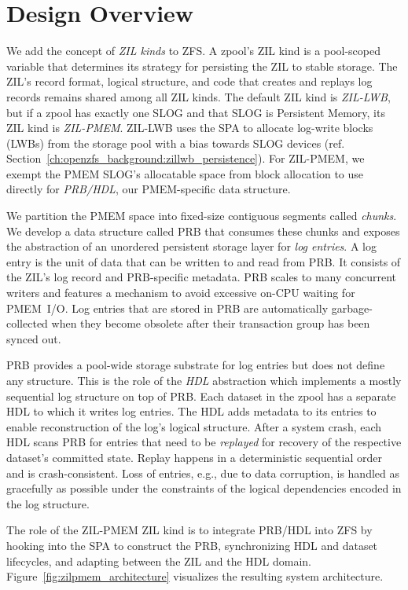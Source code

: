 \documentclass[12pt,a4paper,twoside]{book}
\begin{document}
\section{Design Overview}\label{sec:designoverview}
We add the concept of \textit{ZIL kinds} to ZFS.
A zpool's ZIL kind is a pool-scoped variable that determines its strategy for persisting the ZIL to stable storage.
The ZIL's record format, logical structure, and code that creates and replays log records remains shared among all ZIL kinds.
The default ZIL kind is \textit{ZIL-LWB}, but if a zpool has exactly one SLOG and that SLOG is Persistent Memory, its ZIL kind is \textit{ZIL-PMEM}.
ZIL-LWB uses the SPA to allocate log-write blocks (LWBs) from the storage pool with a bias towards SLOG devices (ref. Section~\ref{ch:openzfs_background:zillwb_persistence}).
For ZIL-PMEM, we exempt the PMEM SLOG's allocatable space from block allocation to use directly for \textit{PRB/HDL}, our PMEM-specific data structure.

We partition the PMEM space into fixed-size contiguous segments called \textit{chunks}.
We develop a data structure called PRB that consumes these chunks and exposes the abstraction of an unordered persistent storage layer for \textit{log entries}.
A log entry is the unit of data that can be written to and read from PRB.
It consists of the ZIL's log record and PRB-specific metadata.
PRB scales to many concurrent writers and features a mechanism to avoid excessive on-CPU waiting for PMEM~I/O.
Log entries that are stored in PRB are automatically garbage-collected when they become obsolete after their transaction group has been synced out.

PRB provides a pool-wide storage substrate for log entries but does not define any structure.
This is the role of the \textit{HDL} abstraction which implements a mostly sequential log structure on top of PRB.
Each dataset in the zpool has a separate HDL to which it writes log entries.
The HDL adds metadata to its entries to enable reconstruction of the log's logical structure.
After a system crash, each HDL scans PRB for entries that need to be \textit{replayed} for recovery of the respective dataset's committed state.
Replay happens in a deterministic sequential order and is crash-consistent.
Loss of entries, e.g., due to data corruption, is handled as gracefully as possible under the constraints of the logical dependencies encoded in the log structure.

The role of the ZIL-PMEM ZIL kind is to integrate PRB/HDL into ZFS by
hooking into the SPA to construct the PRB,
synchronizing HDL and dataset lifecycles, and
adapting between the ZIL and the HDL domain.
Figure~\ref{fig:zilpmem_architecture} visualizes the resulting system architecture.
\end{document}
